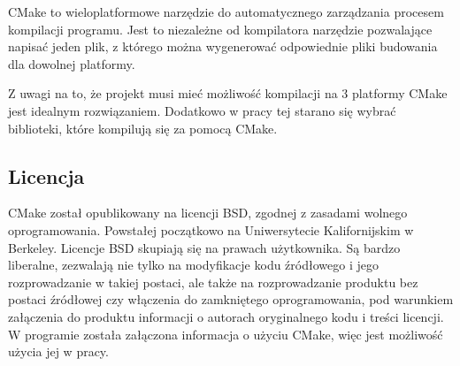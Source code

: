 \par
CMake to wieloplatformowe narzędzie do automatycznego zarządzania procesem kompilacji programu.
Jest to niezależne od kompilatora narzędzie pozwalające napisać jeden plik, z którego można wygenerować odpowiednie pliki budowania dla dowolnej platformy.
\par
Z uwagi na to, że projekt musi mieć możliwość kompilacji na 3 platformy CMake jest idealnym rozwiązaniem.
Dodatkowo w pracy tej starano się wybrać biblioteki, które kompilują się za pomocą CMake.

\subsection*{Licencja}

CMake został opublikowany na licencji BSD, zgodnej z zasadami wolnego oprogramowania.
Powstałej początkowo na Uniwersytecie Kalifornijskim w Berkeley.
Licencje BSD skupiają się na prawach użytkownika.
Są bardzo liberalne, zezwalają nie tylko na modyfikacje kodu źródłowego i jego rozprowadzanie w takiej postaci, ale także na rozprowadzanie produktu bez postaci źródłowej czy włączenia do zamkniętego oprogramowania, pod warunkiem załączenia do produktu informacji o autorach oryginalnego kodu i treści licencji.
W programie została załączona informacja o użyciu CMake, więc jest możliwość użycia jej w pracy.